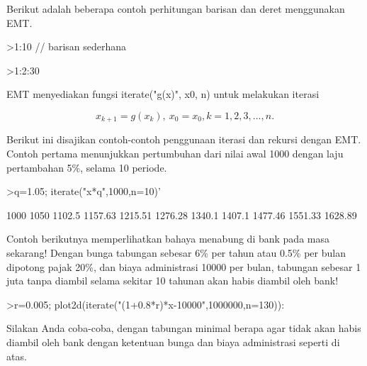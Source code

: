 \documentclass{article}
\begin{document}
\begin{eulernotebook}
\begin{eulercomment}
\begin{eulercomment}
\begin{eulercomment}
\begin{eulercomment}
\begin{eulercomment}
\begin{eulercomment}
\begin{eulercomment}
Berikut adalah beberapa contoh perhitungan barisan dan deret menggunakan EMT.
\end{eulercomment}
\begin{eulerprompt}
>1:10 // barisan sederhana
\end{eulerprompt}
\begin{euleroutput}
  [1,  2,  3,  4,  5,  6,  7,  8,  9,  10]
\end{euleroutput}
\begin{eulerprompt}
>1:2:30
\end{eulerprompt}
\begin{euleroutput}
  [1,  3,  5,  7,  9,  11,  13,  15,  17,  19,  21,  23,  25,  27,  29]
\end{euleroutput}
\begin{eulercomment}
EMT menyediakan fungsi iterate("g(x)", x0, n) untuk melakukan iterasi

\end{eulercomment}
\begin{eulerformula}
\[
x_{k+1}=g(x_k), \ x_0=x_0, k= 1, 2, 3, ..., n.
\]
\end{eulerformula}
\begin{eulercomment}
Berikut ini disajikan contoh-contoh penggunaan iterasi dan rekursi dengan EMT. Contoh
pertama menunjukkan pertumbuhan dari nilai awal 1000 dengan laju pertambahan 5\%, selama 10
periode.
\end{eulercomment}
\begin{eulerprompt}
>q=1.05; iterate("x*q",1000,n=10)'
\end{eulerprompt}
\begin{euleroutput}
           1000 
           1050 
         1102.5 
        1157.63 
        1215.51 
        1276.28 
         1340.1 
         1407.1 
        1477.46 
        1551.33 
        1628.89 
\end{euleroutput}
\begin{eulercomment}
Contoh berikutnya memperlihatkan bahaya menabung di bank pada masa sekarang! Dengan bunga
tabungan sebesar 6\% per tahun atau 0.5\% per bulan dipotong pajak 20\%, dan biaya administrasi
10000 per bulan, tabungan sebesar 1 juta tanpa diambil selama sekitar 10 tahunan akan habis
diambil oleh bank!
\end{eulercomment}
\begin{eulerprompt}
>r=0.005; plot2d(iterate("(1+0.8*r)*x-10000",1000000,n=130)):
\end{eulerprompt}
\begin{eulercomment}
Silakan Anda coba-coba, dengan tabungan minimal berapa agar tidak akan habis diambil oleh
bank dengan ketentuan bunga dan biaya administrasi seperti di atas.


\end{eulercomment}
\end{eulercomment}
\end{eulercomment}
\end{eulercomment}
\end{eulercomment}
\end{eulercomment}
\end{eulercomment}
\end{eulernotebook}
\end{document}
